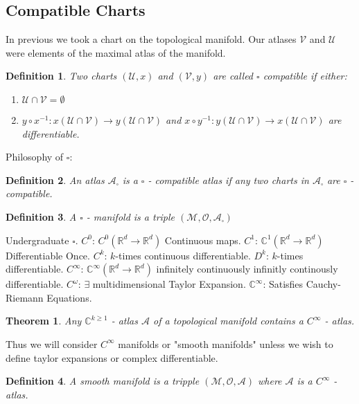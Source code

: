 \documentclass[10pt, oneside]{article}
\newcommand{\R}{\mathbb{R}}
\newcommand{\C}{\mathbb{C}}
\newcommand{\M}{\mathcal{M}}
\newtheorem{thm}{Theorem}
\newtheorem{defn}{Definition}
\begin{document}
  \subsection{Compatible Charts}
     In previous we took a chart on the topological manifold. Our atlases $\mathcal{V}$ and $\mathcal{U}$ were elements of the maximal atlas of the manifold.
     \begin{defn}
        Two charts $(\mathcal{U},x)$ and $(\mathcal{V},y)$ are called $\square$ compatible if either:
        \begin{enumerate}
        \item $\mathcal{U} \cap \mathcal{V} = \emptyset$
        \item $y \circ x^{-1}: x(\mathcal{U} \cap \mathcal{V}) \to y(\mathcal{U} \cap \mathcal{V})$ and $x \circ y^{-1}: y(\mathcal{U} \cap \mathcal{V}) \to x(\mathcal{U} \cap \mathcal{V})$ are differentiable.
        \end{enumerate}
     \end{defn}
     Philosophy of $\square$:
        \begin{defn}
           An atlas $\mathcal{A}_\square$ is a $\square$ - compatible atlas if any two charts in $\mathcal{A}_\square$ are $\square$ - compatible.
        \end{defn}
        \begin{defn}
           A $\square$ - manifold is a triple $(\M, \mathcal{O}, \mathcal{A}_\square)$
        \end{defn}
     Undergraduate $\square$. $C^0$: $C^0 (\R^d \to \R^d)$ Continuous maps. $C^1$: $\C^1 (\R^d \to \R^d)$ Differentiable Once. $C^k$: $k$-times continuous differentiable.
     $D^k$: $k$-times differentiable. $C^\infty$: $\C^\infty (\R^d \to \R^d)$ infinitely continuously infinitly continously differentiable. $C^\omega$: $\exists$ multidimensional Taylor Expansion.
     $\C^\infty$: Satisfies Cauchy-Riemann Equations.
     \begin{thm}
        Any $\C^{k \geq 1}$ - atlas $\mathcal{A}$ of a topological manifold contains a $C^\infty$ - atlas.
     \end{thm}
     Thus we will consider $C^\infty$ manifolds or "smooth manifolds" unless we wish to define taylor expansions or complex differentiable.
     \begin{defn}
        A smooth manifold is a tripple $(\M,\mathcal{O}, \mathcal{A})$ where $\mathcal{A}$ is a $C^\infty$ - atlas.
     \end{defn}
\end{document}
